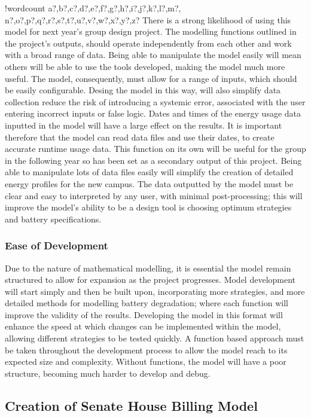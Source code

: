 \documentclass[fontsize=9.5pt]{extarticle}
\numberwithin{figure}{section} %
\newcounter{words}
\newenvironment{counted}{%
  \setcounter{words}{0}
  \SearchList!{wordcount}{\stepcounter{words}}
    {a?,b?,c?,d?,e?,f?,g?,h?,i?,j?,k?,l?,m?,
    n?,o?,p?,q?,r?,s?,t?,u?,v?,w?,x?,y?,z?}
  \UndoBoundary{'}
  \SearchOrder{p;}}{%
  \StopSearching}
\begin{document}
\begin{counted}
There is a strong likelihood of using this model for next year's group
design project. The modelling functions outlined in the project's
outputs, should operate independently from each other and work with a
broad range of data. Being able to manipulate the model easily will mean
others will be able to use the tools developed, making the model much
more useful. The model, consequently, must allow for a range of inputs,
which should be easily configurable. Desing the model in this way, will
also simplify data collection reduce the risk of introducing a systemic
error, associated with the user entering incorrect inputs or false
logic. Dates and times of the energy usage data inputted in the model
will have a large effect on the results. It is important therefore that
the model can read data files and use their dates, to create accurate
runtime usage data. This function on its own will be useful for the
group in the following year so has been set as a secondary output of
this project. Being able to manipulate lots of data files easily will
simplify the creation of detailed energy profiles for the new campus.
The data outputted by the model must be clear and easy to interpreted by
any user, with minimal post-processing; this will improve the model's
ability to be a design tool is choosing optimum strategies and battery
specifications.

\subsubsection{Ease of Development}\label{ease-of-development}

Due to the nature of mathematical modelling, it is essential the model
remain structured to allow for expansion as the project progresses.
Model development will start simply and then be built upon,
incorporating more strategies, and more detailed methods for modelling
battery degradation; where each function will improve the validity of
the results. Developing the model in this format will enhance the speed
at which changes can be implemented within the model, allowing different
strategies to be tested quickly. A function based approach must be taken
throughout the development process to allow the model reach to its
expected size and complexity. Without functions, the model will have a
poor structure, becoming much harder to develop and debug.

\subsection{Creation of Senate House Billing
Model}\label{creation-of-senate-house-billing-model}


\end{counted}
\end{document}
